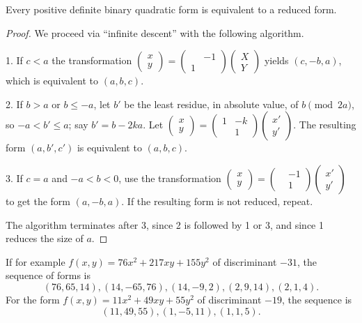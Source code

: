 \begin{theo}[Gauss]
Every positive definite binary quadratic form is equivalent to a reduced form. 
\end{theo}
\begin{proof}
We proceed via ``infinite descent'' with the following algorithm. 

1. If $c<a$ the transformation 
$\begin{pmatrix} x \\ y \end{pmatrix} = \begin{pmatrix} & -1 \\ 1 \end{pmatrix} \begin{pmatrix} X \\ Y \end{pmatrix}$
yields $(c,-b,a)$, which is equivalent to $(a,b,c)$. 

2. If $b>a$ or $b\leqslant -a$, let $b'$ be the least residue, in absolute value, 
of $b\pmod{2a}$, so $-a<b'\leqslant a$; say $b'=b-2 k a$. Let 
$\begin{pmatrix} x \\ y \end{pmatrix} = \begin{pmatrix} 1 & -k \\ & 1 \end{pmatrix} \begin{pmatrix} x' \\ y' \end{pmatrix}$. 
The resulting form $(a,b',c')$ is equivalent to $(a,b,c)$. 

3. If $c=a$ and $-a<b<0$, use the transformation 
$\begin{pmatrix} x \\ y \end{pmatrix} = \begin{pmatrix} & -1 \\ & 1 \end{pmatrix} \begin{pmatrix} x' \\ y' \end{pmatrix}$ 
to get the form $(a,-b,a)$. If the resulting form is not reduced, repeat. 

The algorithm terminates after 3, since 2 is followed by 1 or 3, and since 1 
reduces the size of $a$. 
\end{proof}

If for example $f(x,y) = 76 x^2 + 217 x y + 155 y^2$ of discriminant $-31$, the 
sequence of forms is 
\[
  (76,65,14) , (14,-65,76) , (14,-9,2) , (2,9,14) , (2,1,4) .
\]
For the form $f(x,y) = 11 x^2 + 49 x y + 55 y^2$ of discriminant $-19$, the 
sequence is 
\[
  (11,49,55), (1,-5,11), (1,1,5) .
\]


